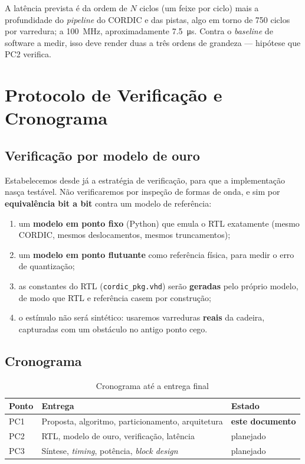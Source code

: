 \documentclass[conference]{IEEEtran}
\begin{document}
A lat\^encia prevista \'e da ordem de $N$ ciclos (um feixe por ciclo) mais a
profundidade do \emph{pipeline} do CORDIC e das pistas, algo em torno de
\num{750} ciclos por varredura; a \SI{100}{\mega\hertz}, aproximadamente
\SI{7.5}{\micro\second}. Contra o \emph{baseline} de software a medir, isso deve
render duas a tr\^es ordens de grandeza --- hip\'otese que PC2 verifica.

\section{Protocolo de Verifica\c{c}\~ao e Cronograma}

\subsection{Verifica\c{c}\~ao por modelo de ouro}
Estabelecemos desde j\'a a estrat\'egia de verifica\c{c}\~ao, para que a
implementa\c{c}\~ao nasça test\'avel. N\~ao verificaremos por inspe\c{c}\~ao de
formas de onda, e sim por \textbf{equival\^encia bit a bit} contra um modelo de
refer\^encia:
\begin{enumerate}
\item um \textbf{modelo em ponto fixo} (Python) que emula o RTL exatamente
(mesmo CORDIC, mesmos deslocamentos, mesmos truncamentos);
\item um \textbf{modelo em ponto flutuante} como refer\^encia f\'isica, para medir
o erro de quantiza\c{c}\~ao;
\item as constantes do RTL (\texttt{cordic\_pkg.vhd}) ser\~ao \textbf{geradas}
pelo pr\'oprio modelo, de modo que RTL e refer\^encia casem por constru\c{c}\~ao;
\item o est\'imulo n\~ao ser\'a sint\'etico: usaremos varreduras \textbf{reais} da
cadeira, capturadas com um obst\'aculo no antigo ponto cego.
\end{enumerate}

\subsection{Cronograma}
\begin{table}[!t]
\caption{Cronograma at\'e a entrega final}
\label{tab:crono}
\centering\footnotesize
\begin{tabular}{@{}lll@{}}
\toprule
\textbf{Ponto} & \textbf{Entrega} & \textbf{Estado} \\
\midrule
PC1 & Proposta, algoritmo, particionamento, arquitetura & \textbf{este documento} \\
PC2 & RTL, modelo de ouro, verifica\c{c}\~ao, lat\^encia & planejado \\
PC3 & S\'intese, \emph{timing}, pot\^encia, \emph{block design} & planejado \\
\bottomrule
\end{tabular}
\end{table}
\end{document}
